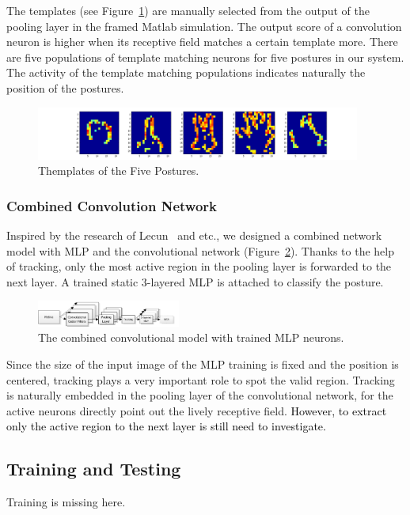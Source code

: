 \documentclass[journal]{journal}
\begin{document}
The templates (see Figure~\ref{fig:template}) are manually selected from the output of the pooling layer in the framed Matlab simulation. 
The output score of a convolution neuron is higher when its receptive field matches a certain template more. 
There are five populations of template matching neurons for five postures in our system. 
The activity of the template matching populations indicates naturally the position of the postures.

\begin{figure}
\centering
	\includegraphics[width=0.95\textwidth]{pics/guesture.png}
	\caption{Themplates of the Five Postures.}
	\label{fig:template}
\end{figure}

\subsubsection{Combined Convolution Network}
Inspired by the research of Lecun~\cite{lecun1998gradient} and etc., we designed a combined network model with MLP and the convolutional network (Figure~\ref{fig:model2}). 
Thanks to the help of tracking, only the most active region in the pooling layer is forwarded to the next layer. 
A trained static 3-layered MLP is attached to classify the posture.

\begin{figure}
\centering
	\includegraphics[width=0.42\textwidth]{pics/model2.pdf}
	\caption{The combined convolutional model with trained MLP neurons.}
	\label{fig:model2}
\end{figure}

Since the size of the input image of the MLP training is fixed and the position is centered, tracking plays a very important role to spot the valid region. 
Tracking is naturally embedded in the pooling layer of the convolutional network, for the active neurons directly point out the lively receptive field. 
\textcolor{black}{However, to extract only the active region to the next layer is still need to investigate.}

\subsection{Training and Testing}
\label{sec:tat}
Training is missing here.
\end{document}
